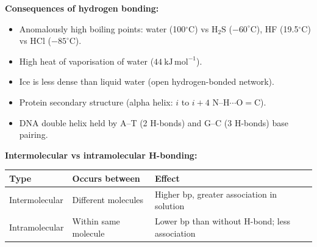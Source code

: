 \documentclass[12pt,a4paper]{article}
\begin{document}
\begin{tcolorbox}[tikzbox, title={Hydrogen Bonding in Water}]
\centering
{}
\end{tcolorbox}

\textbf{Consequences of hydrogen bonding:}
\begin{itemize}[leftmargin=*, itemsep=2pt, topsep=2pt]
  \item Anomalously high boiling points: water (100$^\circ$C) vs $\mathrm{H_2S}$ ($-60^\circ$C), HF (19.5$^\circ$C) vs HCl ($-85^\circ$C).
  \item High heat of vaporisation of water ($44\ \mathrm{kJ\,mol^{-1}}$).
  \item Ice is less dense than liquid water (open hydrogen-bonded network).
  \item Protein secondary structure (alpha helix: $i$ to $i+4$ N--H$\cdots$O$=$C).
  \item DNA double helix held by A--T (2 H-bonds) and G--C (3 H-bonds) base pairing.
\end{itemize}

\textbf{Intermolecular vs intramolecular H-bonding:}\par\noindent
\begin{tabularx}{\linewidth}{|B{3.2cm}|Y|Y|}
\hline
\textbf{Type} & \textbf{Occurs between} & \textbf{Effect} \\
\hline
Intermolecular & Different molecules & Higher bp, greater association in solution \\
\hline
Intramolecular & Within same molecule & Lower bp than without H-bond; less association \\
\hline
\end{tabularx}
\end{document}
